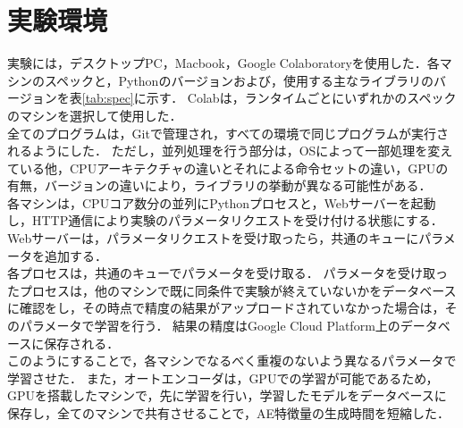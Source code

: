 \section{実験環境}
実験には，デスクトップPC，Macbook，Google Colaboratoryを使用した．各マシンのスペックと，Pythonのバージョンおよび，使用する主なライブラリのバージョンを表\ref{tab:spec}に示す．
Colabは，ランタイムごとにいずれかのスペックのマシンを選択して使用した．\\
全てのプログラムは，Gitで管理され，すべての環境で同じプログラムが実行されるようにした．
ただし，並列処理を行う部分は，OSによって一部処理を変えている他，CPUアーキテクチャの違いとそれによる命令セットの違い，GPUの有無，バージョンの違いにより，ライブラリの挙動が異なる可能性がある．\\

各マシンは，CPUコア数分の並列にPythonプロセスと，Webサーバーを起動し，HTTP通信により実験のパラメータリクエストを受け付ける状態にする．\\
Webサーバーは，パラメータリクエストを受け取ったら，共通のキューにパラメータを追加する．\\
各プロセスは，共通のキューでパラメータを受け取る．
パラメータを受け取ったプロセスは，他のマシンで既に同条件で実験が終えていないかをデータベースに確認をし，その時点で精度の結果がアップロードされていなかった場合は，そのパラメータで学習を行う．
結果の精度はGoogle Cloud Platform上のデータベースに保存される．\\

このようにすることで，各マシンでなるべく重複のないよう異なるパラメータで学習させた．
また，オートエンコーダは，GPUでの学習が可能であるため，GPUを搭載したマシンで，先に学習を行い，学習したモデルをデータべースに保存し，全てのマシンで共有させることで，AE特徴量の生成時間を短縮した．\\



